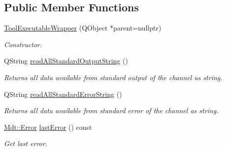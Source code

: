 \subsection*{Public Member Functions}
\begin{DoxyCompactItemize}
\item 
\hyperlink{class_mdt_1_1_deploy_utils_1_1_tool_executable_wrapper_a185d5724b1615df610d30e35070cb414}{Tool\+Executable\+Wrapper} (Q\+Object $\ast$parent=nullptr)\hypertarget{class_mdt_1_1_deploy_utils_1_1_tool_executable_wrapper_a185d5724b1615df610d30e35070cb414}{}\label{class_mdt_1_1_deploy_utils_1_1_tool_executable_wrapper_a185d5724b1615df610d30e35070cb414}

\begin{DoxyCompactList}\small\item\em Constructor. \end{DoxyCompactList}\item 
Q\+String \hyperlink{class_mdt_1_1_deploy_utils_1_1_tool_executable_wrapper_a16c605f652c0ce1df320abc514baa285}{read\+All\+Standard\+Output\+String} ()\hypertarget{class_mdt_1_1_deploy_utils_1_1_tool_executable_wrapper_a16c605f652c0ce1df320abc514baa285}{}\label{class_mdt_1_1_deploy_utils_1_1_tool_executable_wrapper_a16c605f652c0ce1df320abc514baa285}

\begin{DoxyCompactList}\small\item\em Returns all data available from standard output of the channel as string. \end{DoxyCompactList}\item 
Q\+String \hyperlink{class_mdt_1_1_deploy_utils_1_1_tool_executable_wrapper_a4642cfbc69f58af32dc69b4c4619c002}{read\+All\+Standard\+Error\+String} ()\hypertarget{class_mdt_1_1_deploy_utils_1_1_tool_executable_wrapper_a4642cfbc69f58af32dc69b4c4619c002}{}\label{class_mdt_1_1_deploy_utils_1_1_tool_executable_wrapper_a4642cfbc69f58af32dc69b4c4619c002}

\begin{DoxyCompactList}\small\item\em Returns all data available from standard error of the channel as string. \end{DoxyCompactList}\item 
\hyperlink{class_mdt_1_1_error}{Mdt\+::\+Error} \hyperlink{class_mdt_1_1_deploy_utils_1_1_tool_executable_wrapper_a9289a5137a237600e869e077b97259a8}{last\+Error} () const \hypertarget{class_mdt_1_1_deploy_utils_1_1_tool_executable_wrapper_a9289a5137a237600e869e077b97259a8}{}\label{class_mdt_1_1_deploy_utils_1_1_tool_executable_wrapper_a9289a5137a237600e869e077b97259a8}

\begin{DoxyCompactList}\small\item\em Get last error. \end{DoxyCompactList}\end{DoxyCompactItemize}
